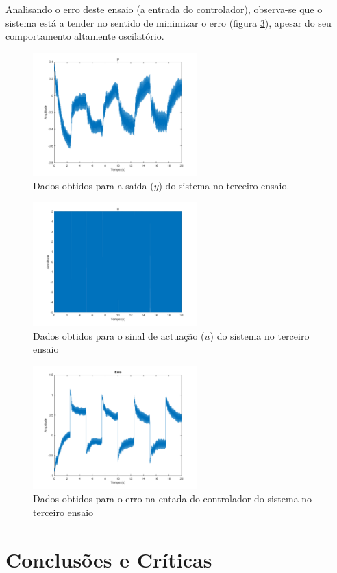 \documentclass[%
  reprint,
  nofootinbib,
  amsmath,amssymb,
  aps,
  10pt,
  a4paper
]{revtex4-1}
\begin{document}
Analisando o erro deste ensaio (a entrada do controlador), observa-se que o sistema está a tender no sentido de minimizar o erro (figura \ref{fig:erro}), apesar do seu comportamento altamente oscilatório.
\begin{figure}[t]
\includegraphics[width=2.5in]{../imgs/dados_00_g/dados_00_g_y.png}
\caption{Dados obtidos para a saída ($y$) do sistema no terceiro ensaio.}
\label{fig:y_g}
\end{figure}
\begin{figure}[t]
\includegraphics[width=2.5in]{../imgs/dados_00_g/dados_00_g_u.png}
\caption{Dados obtidos para o sinal de actuação ($u$) do sistema no terceiro ensaio}
\label{fig:u_g}
\end{figure}
\begin{figure}[t]
\includegraphics[width=2.5in]{../imgs/dados_00_g/dados_00_g_err.png}
\caption{Dados obtidos para o erro na entada do controlador do sistema no terceiro ensaio}
\label{fig:erro}
\end{figure}
\label{s:conclu}

\section{Conclusões e Críticas}
\end{document}
